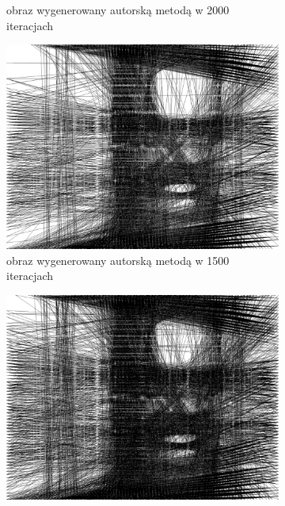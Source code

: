 \begin{figure}[H]
\begin{subfigure}{0.195\textwidth}
            \caption{obraz wygenerowany autorską metodą w 2000 iteracjach}
            \label{comp-comp-joker-shining-e}
        \end{subfigure}
        \begin{subfigure}{0.26\textwidth}
            \centering
            \includegraphics[width = \textwidth]{img/6-comp/shining_r_i1500_c20_inv0_bg10_obj1_ed1.png}
            \caption{obraz wygenerowany autorską metodą w 1500 iteracjach}
            \label{comp-comp-joker-shining-f}
        \end{subfigure}
        \begin{subfigure}{0.26\textwidth}
            \centering
            \includegraphics[width = \textwidth]{img/6-comp/shining_r_i2000_c20_inv0_bg10_obj1_ed1.png}

\end{subfigure}
\end{figure}
